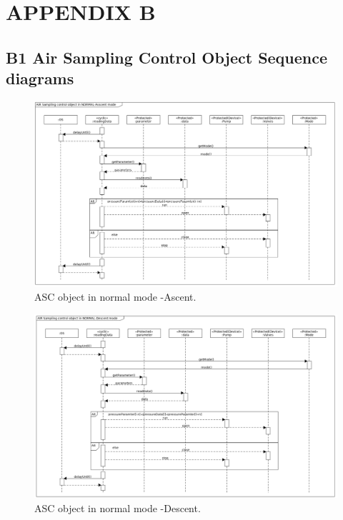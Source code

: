 \section{APPENDIX B} \label{sec:appB}
\subsection*{B1 Air Sampling Control Object Sequence diagrams}
\begin{figure}[H]
    \centering
    \includegraphics[height=0.75\textwidth, angle=270]{appendix/img/ASC-seq-dia-v1-2-a.png}
    \caption{ASC object in normal mode -Ascent.}
    \label{ASCa}
\end{figure}
\begin{figure}[H]
    \centering
    \includegraphics[height=0.9\textwidth, angle=270]{appendix/img/ASC-seq-dia-v1-2-b.png}
    \caption{ASC object in normal mode -Descent.}
    \label{ASCb}
\end{figure}
